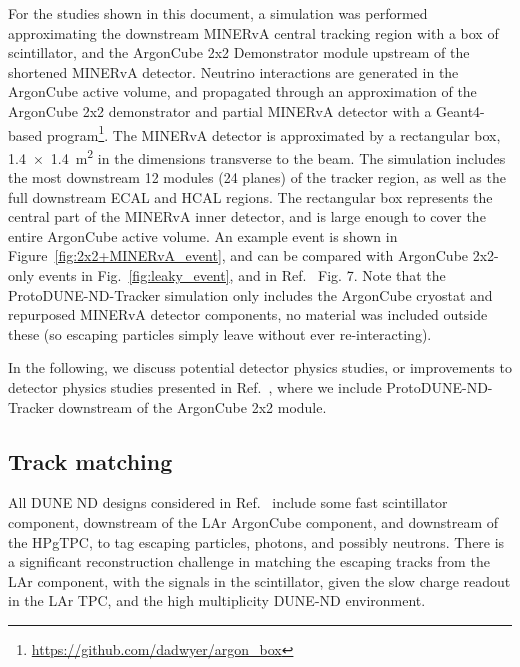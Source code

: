 For the studies shown in this document, a simulation was performed approximating the downstream MINERvA central tracking region with a box of scintillator, and the ArgonCube 2x2 Demonstrator module upstream of the shortened MINERvA detector.
Neutrino interactions are generated in the ArgonCube active volume, and propagated through an approximation of the ArgonCube 2x2 demonstrator and partial MINERvA detector with a Geant4-based program\footnote{\url{https://github.com/dadwyer/argon_box}}.  
The MINERvA detector is approximated by a rectangular box, \SI[product-units=repeat]{1.4x1.4}{\metre\squared} in the dimensions transverse to the beam.  
The simulation includes the most downstream 12 modules (24 planes) of the tracker region, as well as the full downstream ECAL and HCAL regions.  
The rectangular box represents the central part of the MINERvA inner detector, and is large enough to cover the entire ArgonCube active volume. An example event is shown in Figure~\ref{fig:2x2+MINERvA_event}, and can be compared with ArgonCube 2x2-only events in Fig.~\ref{fig:leaky_event}, and in Ref.~\cite{2x2@FNAL} Fig. 7. Note that the ProtoDUNE-ND-Tracker simulation only includes the ArgonCube cryostat and repurposed MINERvA detector components, no material was included outside these (so escaping particles simply leave without ever re-interacting).

In the following, we discuss potential detector physics studies, or improvements to detector physics studies presented in Ref.~\cite{2x2@FNAL}, where we include ProtoDUNE-ND-Tracker downstream of the ArgonCube 2x2 module.

\subsection{Track matching}
All DUNE ND designs considered in Ref.~\cite{dune_ndcsg} include some fast scintillator component, downstream of the LAr ArgonCube component, and downstream of the HPgTPC, to tag escaping particles, photons, and possibly neutrons. There is a significant reconstruction challenge in matching the escaping tracks from the LAr component, with the signals in the scintillator, given the slow charge readout in the LAr TPC, and the high multiplicity DUNE-ND environment.

